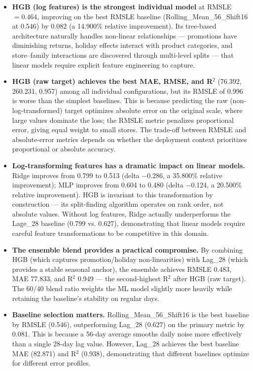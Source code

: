 \begin{itemize}
  \item \textbf{HGB (log features) is the strongest individual model} at RMSLE $= 0.464$, improving on the best RMSLE baseline (Rolling\_Mean\_56\_Shift16 at 0.546) by 0.082 (a 14.900\% relative improvement). Its tree-based architecture naturally handles non-linear relationships — promotions have diminishing returns, holiday effects interact with product categories, and store–family interactions are discovered through multi-level splits — that linear models require explicit feature engineering to capture.
  \item \textbf{HGB (raw target) achieves the best MAE, RMSE, and R$^2$} (76.392, 260.231, 0.957) among all individual configurations, but its RMSLE of 0.996 is worse than the simplest baselines. This is because predicting the raw (non-log-transformed) target optimizes absolute error on the original scale, where large values dominate the loss; the RMSLE metric penalizes proportional error, giving equal weight to small stores. The trade-off between RMSLE and absolute-error metrics depends on whether the deployment context prioritizes proportional or absolute accuracy.
  \item \textbf{Log-transforming features has a dramatic impact on linear models.} Ridge improves from 0.799 to 0.513 (delta $-$0.286, a 35.800\% relative improvement); MLP improves from 0.604 to 0.480 (delta $-$0.124, a 20.500\% relative improvement). HGB is invariant to this transformation by construction — its split-finding algorithm operates on rank order, not absolute values. Without log features, Ridge actually underperforms the Lage\_28 baseline (0.799 vs. 0.627), demonstrating that linear models require careful feature transformations to be competitive in this domain.
  \item \textbf{The ensemble blend provides a practical compromise.} By combining HGB (which captures promotion/holiday non-linearities) with Lag\_28 (which provides a stable seasonal anchor), the ensemble achieves RMSLE 0.483, MAE 77.833, and R$^2$ 0.949 — the second-highest R$^2$ after HGB (raw target). The 60/40 blend ratio weights the ML model slightly more heavily while retaining the baseline's stability on regular days.
  \item \textbf{Baseline selection matters.} Rolling\_Mean\_56\_Shift16 is the best baseline by RMSLE (0.546), outperforming Lag\_28 (0.627) on the primary metric by 0.081. This is because a 56-day average smooths daily noise more effectively than a single 28-day lag value. However, Lag\_28 achieves the best baseline MAE (82.871) and R$^2$ (0.938), demonstrating that different baselines optimize for different error profiles.
\end{itemize}

